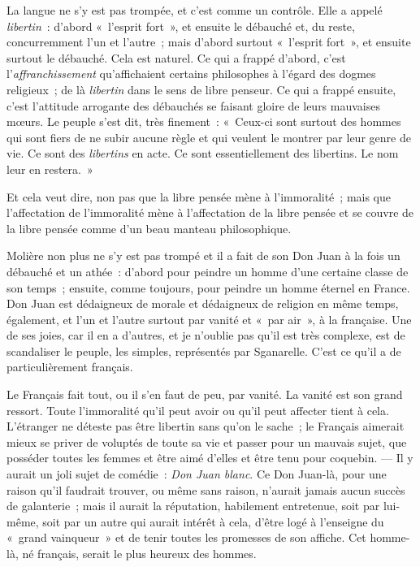 \documentclass[french,twoside]{book} %
\begin{document}
La langue ne s’y est pas trompée, et c’est comme un contrôle. Elle a appelé {\itshape libertin} : d’abord « l’esprit fort », et ensuite le débauché et, du reste, concurremment l’un et l’autre ; mais d’abord surtout « l’esprit fort », et ensuite surtout le débauché. Cela est naturel. Ce qui a frappé d’abord, c’est l’{\itshape affranchissement} qu’affichaient certains philosophes  à l’égard des dogmes religieux ; de là {\itshape libertin} dans le sens de libre penseur. Ce qui a frappé ensuite, c’est l’attitude arrogante des débauchés se faisant gloire de leurs mauvaises mœurs. Le peuple s’est dit, très finement : « Ceux-ci sont surtout des hommes qui sont fiers de ne subir aucune règle et qui veulent le montrer par leur genre de vie. Ce sont des {\itshape libertins} en acte. Ce sont essentiellement des libertins. Le nom leur en restera. »\par
Et cela veut dire, non pas que la libre pensée mène à l’immoralité ; mais que l’affectation de l’immoralité mène à l’affectation de la libre pensée et se couvre de la libre pensée comme d’un beau manteau philosophique.\par
Molière non plus ne s’y est pas trompé et il a fait de son Don Juan à la fois un débauché et un athée : d’abord pour peindre un homme d’une certaine classe de son temps ; ensuite, comme toujours, pour peindre un homme éternel en France. Don Juan est dédaigneux de morale et dédaigneux de religion en même temps, également, et l’un et l’autre surtout par vanité et « par air », à la française. Une de ses joies, car il en a d’autres, et je n’oublie pas qu’il est très complexe, est de scandaliser le peuple, les simples, représentés par Sganarelle. C’est ce qu’il a de particulièrement français.\par
Le Français fait tout, ou il s’en faut de peu, par  vanité. La vanité est son grand ressort. Toute l’immoralité qu’il peut avoir ou qu’il peut affecter tient à cela. L’étranger ne déteste pas être libertin sans qu’on le sache ; le Français aimerait mieux se priver de voluptés de toute sa vie et passer pour un mauvais sujet, que posséder toutes les femmes et être aimé d’elles et être tenu pour coquebin. — Il y aurait un joli sujet de comédie : \emph{Don Juan blanc}. Ce Don Juan-là, pour une raison qu’il faudrait trouver, ou même sans raison, n’aurait jamais aucun succès de galanterie ; mais il aurait la réputation, habilement entretenue, soit par lui-même, soit par un autre qui aurait intérêt à cela, d’être logé à l’enseigne du « grand vainqueur » et de tenir toutes les promesses de son affiche. Cet homme-là, né français, serait le plus heureux des hommes.\par
\end{document}

